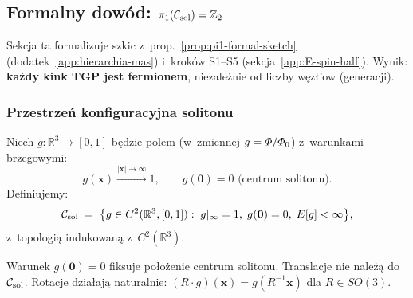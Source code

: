 
\subsection{Formalny dow\'od: $\pi_1(\mathcal{C}_{\rm sol}) = \mathbb{Z}_2$}%
\label{app:pi1-formal-proof}

Sekcja ta formalizuje szkic z~prop.~\ref{prop:pi1-formal-sketch}
(dodatek~\ref{app:hierarchia-mas}) i~krok\'ow S1--S5
(sekcja~\ref{app:E-spin-half}).
Wynik: \textbf{ka\.zdy kink TGP jest fermionem},
niezale\.znie od liczby w\k{e}z\l{}'ow (generacji).

\subsubsection{Przestrze\'n konfiguracyjna solitonu}%
\label{sssec:config-space}

\begin{definition}%
\label{def:C-sol}
Niech $g: \mathbb{R}^3 \to [0,1]$ b\k{e}dzie polem
(w~zmiennej $g = \varPhi/\varPhi_0$) z~warunkami brzegowymi:
\begin{equation}
  g(\mathbf{x}) \xrightarrow{|\mathbf{x}|\to\infty} 1,
  \qquad
  g(\mathbf{0}) = 0 \text{ (centrum solitonu)}.
\end{equation}
Definiujemy:
\begin{equation}\label{eq:C-sol-def}
  \mathcal{C}_{\rm sol} \;=\;
  \bigl\{ g \in C^2(\mathbb{R}^3, [0,1]) :\;
    g|_\infty = 1,\; g(\mathbf{0}) = 0,\;
    E[g] < \infty \bigr\},
\end{equation}
z~topologi\k{a} indukowaną z~$C^2(\mathbb{R}^3)$.
\end{definition}

\begin{remark}
Warunek $g(\mathbf{0}) = 0$ fiksuje po\l{}o\.zenie centrum solitonu.
Translacje nie nale\.z\k{a} do $\mathcal{C}_{\rm sol}$.
Rotacje dzia\l{}aj\k{a} naturalnie:
$(R \cdot g)(\mathbf{x}) = g(R^{-1}\mathbf{x})$ dla $R \in SO(3)$.
\end{remark}

